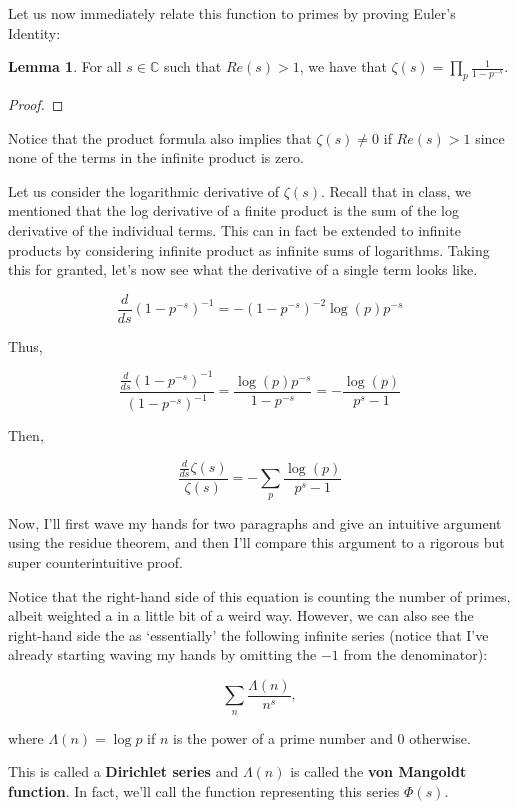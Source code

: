 \documentclass{article}
\theoremstyle{definition}
\newtheorem{lemma}[theorem]{Lemma}
\newcommand{\C}{\mathbb{C}}
\begin{document}
Let us now immediately relate this function to primes by proving Euler's Identity:

\begin{lemma}
    For all $ s \in \C $ such that $ Re(s) > 1 $, we have that $ \zeta(s) = \prod_{p} \frac{1}{1 - p^{-s}} $.
\end{lemma}

\begin{proof}
    
\end{proof}

Notice that the product formula also implies that $ \zeta(s) \neq 0 $ if $ Re(s) > 1 $ since
none of the terms in the infinite product is zero.

Let us consider the logarithmic derivative of $ \zeta(s) $.
Recall that in class, we mentioned that the log derivative of a finite product is the sum of the
log derivative of the individual terms. This can in fact be extended to infinite products
by considering infinite product as infinite sums of logarithms. Taking this for granted,
let's now see what the derivative of a single term looks like.


\[ \frac{d}{ds} (1 - p^{-s})^{-1} = - (1 - p^{-s})^{-2} \log(p) p^{-s}\]

Thus, 

\[ \frac{\frac{d}{ds} (1 - p^{-s})^{-1}}{(1 - p^{-s})^{-1}} = \frac{\log(p) p^{-s}}{1 - p^{-s}} = - \frac{\log (p)}{p^{s} - 1} \]

Then, 

\[ \frac{\frac{d}{ds} \zeta(s)}{\zeta(s)} = - \sum_{p} \frac{\log (p)}{p^{s} - 1} \]


Now, I'll first wave my hands for two paragraphs and give an intuitive argument
using the residue theorem, and then I'll compare this argument to a rigorous
but super counterintuitive proof.

Notice that the right-hand side of this equation is counting the number of primes, albeit
weighted a in a little bit of a weird way. However, we can also see the right-hand side the as
`essentially' the following infinite series (notice that I've already starting waving my hands
by omitting the $ -1 $ from the denominator):

\[ \sum_{n} \frac{\Lambda(n)}{n^{s}}, \]

where $ \Lambda(n) = \log p $ if $ n $ is the power of a prime number and $ 0 $ otherwise.

This is called a \textbf{Dirichlet series} and $ \Lambda(n) $ is called the \textbf{von Mangoldt function}.
In fact, we'll call the function representing this series $ \Phi(s) $.
\end{document}
